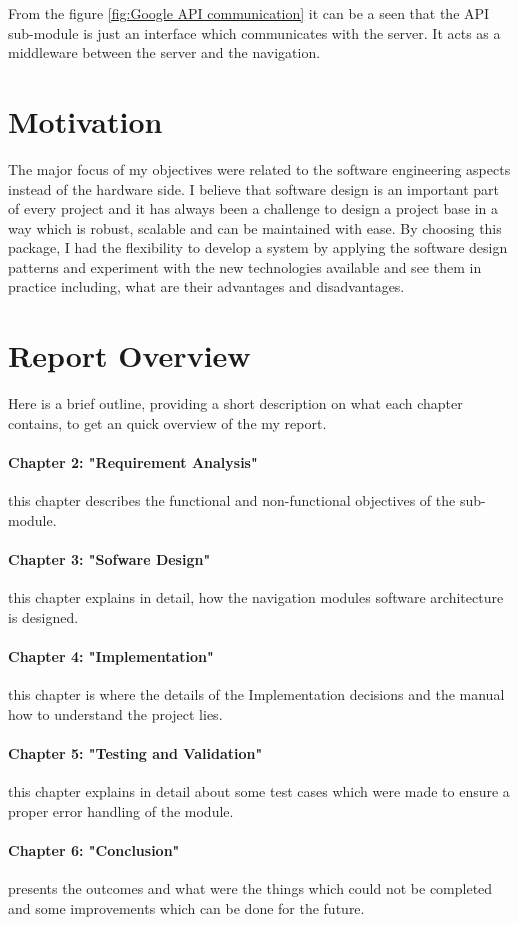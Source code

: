 	\par
		From the figure \ref{fig:Google API communication} it can be a seen that the API sub-module is 
		just an interface which communicates with the server. It acts as a 
		middleware between the server and the navigation.

	\section{Motivation}
		The major focus of my objectives were related to the software engineering aspects instead of
		the hardware side. I believe that software design is an important part of every project and
		it has always been a challenge to design a project base
		in a way which is robust, scalable and can be maintained with ease. By choosing this package,
		I had the flexibility to develop a system by applying the software design patterns and experiment with 
		the new	technologies available and see them in practice including, what are 
		their advantages and disadvantages. 

	\section{Report Overview}
		Here is a brief outline, providing a short description on what each chapter contains, to get an
		quick overview of the my report.
		
		\paragraph{Chapter 2: "Requirement Analysis"}
			this chapter describes the functional and non-functional objectives of the sub-module. 
		\paragraph{Chapter 3: "Sofware Design"}
			this chapter explains in detail, how the navigation modules software architecture is designed. 
		\paragraph{Chapter 4: "Implementation"} 
			this chapter is where the details of the Implementation decisions and the manual how to understand 
			the project lies.
		\paragraph{Chapter 5: "Testing and Validation"}
			this chapter explains in detail about some test cases which were made to ensure  
			a proper error handling of the module. 
		\paragraph{Chapter 6: "Conclusion"} 
			presents the outcomes and what were the things which could not be completed and some improvements
			which can be done for the future.
